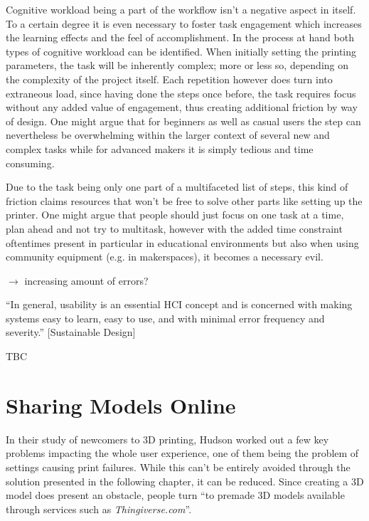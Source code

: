 Cognitive workload being a part of the workflow isn't a negative aspect in itself. 
To a certain degree it is even necessary to foster task engagement which increases the learning effects and the feel of accomplishment.
In the process at hand both types of cognitive workload can be identified.
When initially setting the printing parameters, the task will be inherently complex; more or less so, depending on the complexity of the project itself. 
Each repetition however does turn into extraneous load, since having done the steps once before, the task requires focus without any added value of engagement, thus creating additional friction by way of design. 
One might argue that for beginners as well as casual users the step can nevertheless be overwhelming within the larger context of several new and complex tasks while for advanced makers it is simply tedious and time consuming. 

Due to the task being only one part of a multifaceted list of steps, this kind of friction claims resources that won't be free to solve other parts like setting up the printer. 
One might argue that people should just focus on one task at a time, plan ahead and not try to multitask, however with the added time constraint oftentimes present in particular in educational environments but also when using community equipment (e.g. in makerspaces), it becomes a necessary evil. %


$\rightarrow$ increasing amount of errors? 

``In general, usability is an essential HCI concept and is concerned with making systems easy to learn, easy to use, and with minimal error frequency and severity.'' [Sustainable Design]

TBC

\section{Sharing Models Online}

In their study of newcomers to 3D printing, Hudson \etal worked out a few key problems impacting the whole user experience, one of them being the problem of settings causing print failures.\cite{hudson_understanding_2016} 
While this can't be entirely avoided through the solution presented in the following chapter, it can be reduced. 
Since creating a 3D model does present an obstacle, people turn ``to premade 3D models available through services such as \textit{Thingiverse.com}''.\cite{hudson_understanding_2016}

